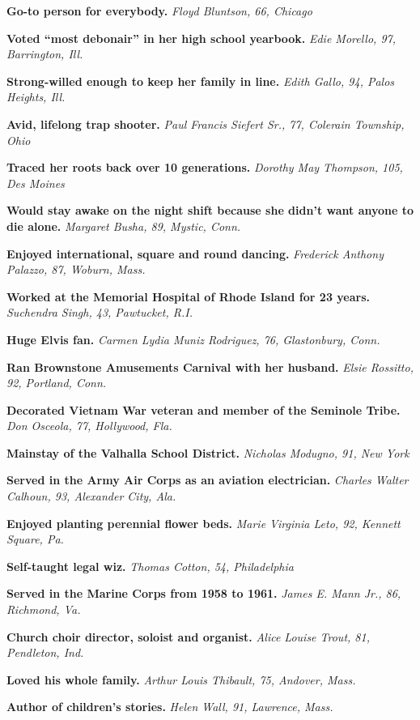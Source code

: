 \textbf{Go-to person for everybody.} \emph{Floyd Bluntson, 66, Chicago}

\textbf{Voted ``most debonair'' in her high school yearbook.} \emph{Edie
Morello, 97, Barrington, Ill.}

\textbf{Strong-willed enough to keep her family in line.} \emph{Edith
Gallo, 94, Palos Heights, Ill.}

\textbf{Avid, lifelong trap shooter.} \emph{Paul Francis Siefert Sr.,
77, Colerain Township, Ohio}

\textbf{Traced her roots back over 10 generations.} \emph{Dorothy May
Thompson, 105, Des Moines}

\textbf{Would stay awake on the night shift because she didn't want
anyone to die alone.} \emph{Margaret Busha, 89, Mystic, Conn.}

\textbf{Enjoyed international, square and round dancing.}
\emph{Frederick Anthony Palazzo, 87, Woburn, Mass.}

\textbf{Worked at the Memorial Hospital of Rhode Island for 23 years.}
\emph{Suchendra Singh, 43, Pawtucket, R.I.}

\textbf{Huge Elvis fan.} \emph{Carmen Lydia Muniz Rodriguez, 76,
Glastonbury, Conn.}

\textbf{Ran Brownstone Amusements Carnival with her husband.}
\emph{Elsie Rossitto, 92, Portland, Conn.}

\textbf{Decorated Vietnam War veteran and member of the Seminole Tribe.}
\emph{Don Osceola, 77, Hollywood, Fla.}

\textbf{Mainstay of the Valhalla School District.} \emph{Nicholas
Modugno, 91, New York}

\textbf{Served in the Army Air Corps as an aviation electrician.}
\emph{Charles Walter Calhoun, 93, Alexander City, Ala.}

\textbf{Enjoyed planting perennial flower beds.} \emph{Marie Virginia
Leto, 92, Kennett Square, Pa.}

\textbf{Self-taught legal wiz.} \emph{Thomas Cotton, 54, Philadelphia}

\textbf{Served in the Marine Corps from 1958 to 1961.} \emph{James E.
Mann Jr., 86, Richmond, Va.}

\textbf{Church choir director, soloist and organist.} \emph{Alice Louise
Trout, 81, Pendleton, Ind.}

\textbf{Loved his whole family.} \emph{Arthur Louis Thibault, 75,
Andover, Mass.}

\textbf{Author of children's stories.} \emph{Helen Wall, 91, Lawrence,
Mass.}


